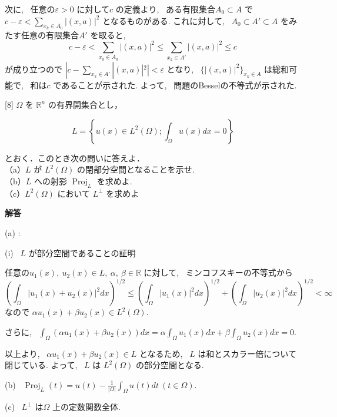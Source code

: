 \documentclass{jsarticle}
\begin{document}
次に, \ 任意の$\varepsilon > 0$ に対して$c$ の定義より, \ ある有限集合$A_0 \subset A$ で$c - \varepsilon < \displaystyle \sum_{x_k \in A_0} |(x, a)|^2$ となるものがある. これに対して, \ $A_0 \subset A' \subset A$ をみたす任意の有限集合$A'$ を取ると, \ 
$$
c - \varepsilon < \displaystyle \sum_{x_k \in A_0} |(x, a)|^2 \le \displaystyle \sum_{x_k \in A'} |(x, a)|^2 \le c
$$
が成り立つので $|c - \displaystyle \sum_{x_k \in A'} |(x, a)|^2| < \varepsilon$ となり, \ $\{|(x, a)|^2 \}_{x_k \in A}$ は総和可能で, \ 和は$c$ であることが示された. よって, \ 問題のBesselの不等式が示された.

\bigskip
\bigskip

\begin{itembox}[l]{[8]}
  $\Omega$ を $\mathbb{R}^{n}$ の有界開集合とし，

$$
L=\left\{u(x) \in L^{2}(\Omega) ; \int_{\Omega} u(x) d x=0\right\}
$$

とおく．このとき次の問いに答えよ．\\
（a）$L$ が $L^{2}(\Omega)$ の閉部分空間となることを示せ.\\
（b）$L$ への射影 $\operatorname{Proj}_{L}$ を求めよ.\\
（c）$L^{2}(\Omega)$ において $L^{\perp}$ を求めよ
\end{itembox}

\textbf{解答}

(a) :

(i) \ $L$ が部分空間であることの証明

任意の$u_1(x), \ u_2(x) \in L, \ \alpha, \ \beta \in \mathbb{R}$ に対して, \ ミンコフスキーの不等式から
\[\left(\int_\Omega |u_1(x) + u_2(x)|^2 dx \right)^{1/2} \le 
\left(\int_\Omega |u_1(x)|^2 dx \right)^{1/2} + \left(\int_\Omega |u_2(x)|^2 dx \right)^{1/2} 
< \infty \] なので $\alpha u_1(x) + \beta u_2(x) \in L^2(\Omega)$.

さらに, \ $\displaystyle \int_\Omega (\alpha u_1(x) + \beta u_2(x)) dx = \alpha \int_\Omega u_1(x) dx + \beta \int_\Omega u_2(x) dx = 0$.

以上より, \ $\alpha u_1(x) + \beta u_2(x) \in L$ となるため, \ $L$ は和とスカラー倍について閉じている. よって, \ $L$ は $L^{2}(\Omega)$ の部分空間となる.

\bigskip

(b) \ $\operatorname{Proj}_{L} (t) = u(t) - \displaystyle\frac{1}{|\Omega|} \int_\Omega u(t) dt \ (t \in \Omega)$.

\bigskip

(c) \ $L^{\perp}$ は$\Omega$ 上の定数関数全体.
\end{document}
